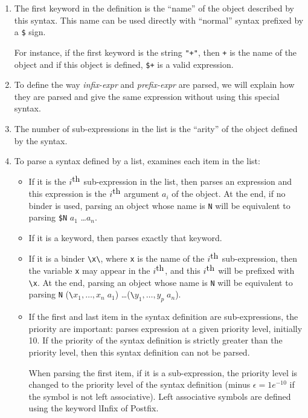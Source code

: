 \begin{enumerate}
\item The first keyword in the definition is the ``name'' of the
object described by this syntax. This name can be used directly with
``normal'' syntax prefixed by a \verb#$# sign.

For instance, if the first keyword is the string \verb#"+"#, then
\verb#+# is the name of the object and if this object is defined,
\verb#$+# is a valid expression.

\item To define the way  {\it infix-expr} and {\it prefix-expr} are
parsed, we will explain how they are parsed and give the same
expression without using this special syntax.

\item The number of sub-expressions in the list is the ``arity'' of
the object defined by the syntax.

\item To parse a syntax defined by a list, \AFD{}  examines each item in
the list:
\begin{itemize}
\item If it is the $i^{\hbox{th}}$ sub-expression in the list,
then \AFD{}  parses an expression and this expression is the $i^{\hbox{th}}$
argument $a_i$ of the object. At the end, if no binder is used,
parsing an object whose name is \verb#N# will be equivalent to parsing
\verb#$N# $a_1$ \dots $a_n$.

\item If it is a keyword, then \AFD{}  parses exactly that keyword.

\item If it is a binder \verb#\x\#, where \verb#x# is the name
of the $i^{\hbox{th}}$ sub-expression, then the variable \verb#x# may appear in
the $i^{\hbox{th}}$, and this $i^{\hbox{th}}$ will be prefixed with
\verb#\x#. At the end,
parsing an object whose name is \verb#N# will be equivalent to parsing
\verb#N# (\verb#\#$x_1,\dots,x_n\;a_1$) \dots (\verb#\#$y_1,\dots,y_p\;a_n$).

\item If the first and last item in the syntax definition are
sub-expressions, the priority are important: \AFD{}  parses expression at
a given priority level, initially 10. If the priority of the syntax
definition is strictly greater than the priority level, then this
syntax definition can not be parsed.

When parsing the first item, if it is a sub-expression, the
priority level is changed to the priority level of the syntax
definition (minus $\epsilon = 1e^{-10}$ if the symbol is not left
associative). Left associative symbols are defined using the keyword
lInfix of Postfix.


\end{itemize}
\end{enumerate}

